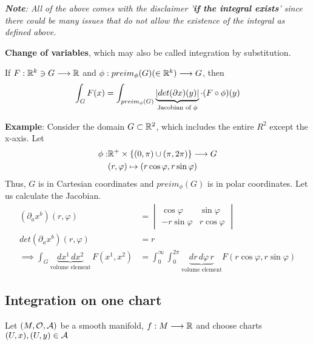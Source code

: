 \textit{\textbf{Note}: All of the above comes with the disclaimer '\textbf{if the integral exists}' since there could be many issues that do not allow the existence of the integral as defined above.}

\textbf{Change of variables}, which may also be called integration by substitution.

\begin{theorem}
If $F : \mathbb{R}^k \ni G \longrightarrow \mathbb{R}$ and $\phi : preim_\phi(G) (\in \mathbb{R}^k) \longrightarrow G$, then
\[
\int_G F(x) = \int_{preim_\phi(G)} \underbrace{\left\lvert det(\partial x)(y) \right\rvert}_{\text{Jacobian of }\phi} \cdot (F \circ \phi)(y)
\]
\end{theorem}


\textbf{Example}: Consider the domain $G \subset \mathbb{R}^2$, which includes the entire $R^2$ except the x-axis. Let
\begin{align*}
\phi : & \mathbb{R}^+ \times \lbrace(0,\pi) \cup (\pi,2\pi)\rbrace \longrightarrow G \\
& (r, \varphi) \mapsto (r\cos\varphi, r\sin\varphi)
\end{align*}
Thus, $G$ is in Cartesian coordinates and $preim_\phi(G)$ is in polar coordinates. Let us calculate the Jacobian.
\begin{align*}
(\partial_a x^b) (r, \varphi) & = \begin{vmatrix}
\cos\varphi & \sin\varphi \\
-r\sin\varphi & r\cos\varphi
\end{vmatrix} \\
det(\partial_a x^b) (r, \varphi) & = r \\
\implies \int_G \underbrace{dx^1 \, dx^2}_{\text{volume element}} \, F(x^1,x^2) & = \int_0^\infty \int_0^{2\pi} \underbrace{dr \, d\varphi \, r}_{\text{volume element}} F(r\cos\varphi, r\sin\varphi)
\end{align*}

\subsection{Integration on one chart}
Let $(M, \mathcal{O}, \mathcal{A})$ be a smooth manifold, $f : M \longrightarrow \mathbb{R}$ and choose charts $(U,x), (U,y) \in \mathcal{A}$

